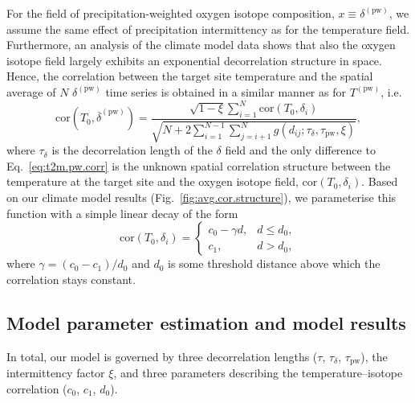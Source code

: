 \documentclass[cp, manuscript]{copernicus}
\begin{document}
For the field of precipitation-weighted oxygen isotope composition, $x \equiv
\delta^{\mathrm{(pw)}}$, we assume the same effect of precipitation
intermittency as for the temperature field. Furthermore, an analysis of the
climate model data shows that also the oxygen isotope field largely exhibits an
exponential decorrelation structure in space. Hence, the correlation between the
target site temperature and the spatial average of $N$ $\delta^{\mathrm{(pw)}}$
time series is obtained in a similar manner as for $T^{\mathrm{(pw)}}$, i.e.
%
\begin{equation}
\label{eq:oxy.pw.corr}
\mathrm{cor}\left(T_0,
  \overline{\delta}^{\mathrm{(pw)}}\right)=
\frac
{\sqrt{1-\xi}\sum_{i=1}^{N}\mathrm{cor}\left(T_0,\delta_i\right)}
{\sqrt{N + 2\sum_{i=1}^{N-1}\sum_{j=i+1}^{N}
  g(d_{ij}; \tau_{\delta}, \tau_{\mathrm{pw}}, \xi)}},
\end{equation}
%
where $\tau_{\delta}$ is the decorrelation length of the $\delta$ field and the
only difference to Eq.~\eqref{eq:t2m.pw.corr} is the unknown spatial correlation
structure between the temperature at the target site and the oxygen isotope
field, $\mathrm{cor}\left(T_0,\delta_i\right)$.  Based on our climate model
results (Fig.~\ref{fig:avg.cor.structure}), we parameterise this function with a
simple linear decay of the form
%
\begin{equation}
\label{eq:t2m.oxy.corr}
\mathrm{cor}\left(T_0,\delta_i\right)=
\begin{cases}
  c_0 - \gamma d, & d \le d_0,\\
  c_1, & d > d_0,
\end{cases}
\end{equation}
%
where $\gamma=(c_0-c_1)/d_0$ and $d_0$ is some threshold distance above which
the correlation stays constant.

\subsection{Model parameter estimation and model results}
\label{app:concept.model.estimation}

In total, our model is governed by three decorrelation lengths ($\tau$,
$\tau_{\delta}$, $\tau_{\mathrm{pw}}$), the intermittency factor $\xi$, and
three parameters describing the temperature--isotope correlation ($c_0$, $c_1$,
$d_0$).
\end{document}
